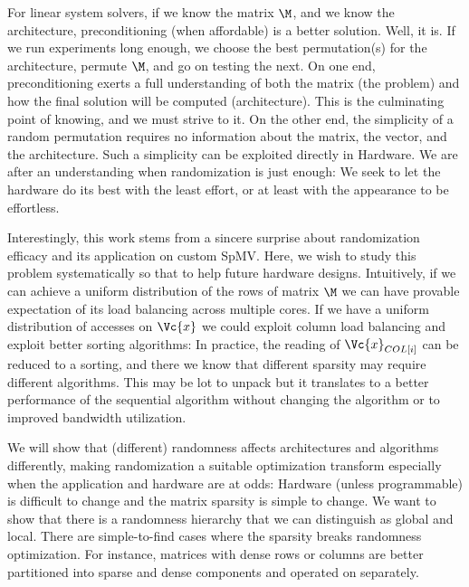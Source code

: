 \documentclass[manuscript,screen]{acmart}
\begin{document}
For linear system solvers, if we know the matrix $\M$, and we know the
architecture, preconditioning (when affordable) is a better solution.
Well, it is. If we run experiments long enough, we choose the best
permutation(s) for the architecture, permute $\M$, and go on testing
the next.  On one end, preconditioning exerts a full understanding of
both the matrix (the problem) and how the final solution will be
computed (architecture). This is the culminating point of knowing, and
we must strive to it. On the other end, the simplicity of a random
permutation requires no information about the matrix, the vector, and
the architecture. Such a simplicity can be exploited directly in
Hardware. We are after an understanding when randomization is just
enough: We seek to let the hardware do its best with the least effort,
or at least with the appearance to be effortless.


Interestingly, this work stems from a sincere surprise about
randomization efficacy and its application on custom SpMV. Here, we
wish to study this problem systematically so that to help future
hardware designs. Intuitively, if we can achieve a uniform
distribution of the rows of matrix $\M$ we can have provable
expectation of its load balancing across multiple cores. If we have a
uniform distribution of accesses on $\Vc{x}$ we could exploit column
load balancing and exploit better sorting algorithms: In practice, the
reading of $\Vc{x}_{COL[i]}$ can be reduced to a sorting, and there we know
that different sparsity  may require different algorithms. This may be 
lot to unpack but it translates to a better performance of the
sequential algorithm without changing the algorithm or to improved bandwidth
utilization.


We will show that (different) randomness affects architectures and
algorithms differently, making randomization a suitable optimization
transform especially when the application and hardware are at odds:
Hardware (unless programmable) is difficult to change and the matrix
sparsity is simple to change. We want to show that there is a
randomness hierarchy that we can distinguish as global and
local. There are simple-to-find cases where the sparsity breaks
randomness optimization.  For instance, matrices with dense rows or
columns are better partitioned into sparse and dense components and
operated on separately.
\newpage 
{}
\end{document}
